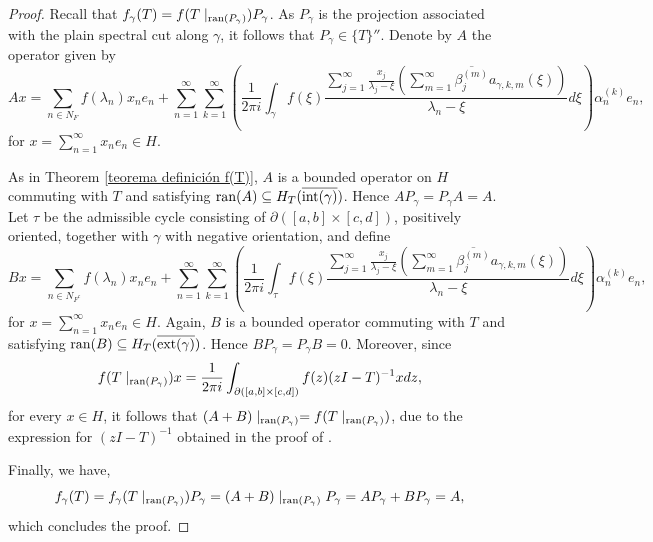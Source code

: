\documentclass[11pt]{amsart}
\theoremstyle{definition}
\theoremstyle{remark}
\numberwithin{equation}{section}
\newcommand{\ran}{\textnormal{ran}}
\newcommand{\al}{\alpha}
\newcommand{\Hint}{H_T(\overline{\inte(\gamma)})}
\newcommand{\Hext}{H_T(\overline{\exte(\gamma)})}
\newcommand{\sumn}{\sum_{n=1}^{\infty}}
\newcommand{\summ}{\sum_{m=1}^{\infty}}
\newcommand{\sumj}{\sum_{j=1}^\infty}
\newcommand{\biconm}[1]{{\{#1\}''}}
\newcommand{\inte}{\textnormal{int}}
\newcommand{\exte}{\textnormal{ext}}
\begin{document}
\begin{proof}
    Recall that $f_\gamma(T) =  f(T\mid_{\ran(P_\gamma)})P_\gamma$. As $P_\gamma$ is the projection associated with the plain spectral cut along $\gamma$, it follows that $P_\gamma \in \biconm{T}.$ Denote by $A$ the operator given by
    $$
    A x= \sum_{n\in N_F} f(\lambda_n)x_ne_n + \sumn \sum_{k=1}^\infty \left( \frac{1}{2\pi i} \int_{\gamma} f(\xi) \frac{ \sumj \frac{x_j}{\lambda_j-\xi}\left(\summ \overline{\beta_j^{(m)}}a_{\gamma,k,m}(\xi)\right)}{\lambda_n-\xi}        d\xi    \right)\al_n^{(k)}e_n,
    $$
    for $x=\sumn x_ne_n \in H$.

    As in Theorem \ref{teorema definición f(T)}, $A$ is a bounded operator on $H$ commuting with $T$ and satisfying $\ran(A)\subseteq \Hint$. Hence $AP_\gamma=P_\gamma A=A$. Let $\tau$ be the admissible cycle consisting of $\partial([a,b]\times[c,d])$, positively oriented, together with $\gamma$ with negative orientation, and define
    $$
    B x= \sum_{n\in N_{F^c}} f(\lambda_n)x_ne_n + \sumn \sum_{k=1}^\infty \left( \frac{1}{2\pi i} \int_{\tau} f(\xi) \frac{ \sumj \frac{x_j}{\lambda_j-\xi}\left(\summ \overline{\beta_j^{(m)}}a_{\gamma,k,m}(\xi)\right)}{\lambda_n-\xi}        d\xi    \right)\al_n^{(k)}e_n,
    $$
for $x=\sumn x_ne_n \in H$. Again, $B$ is a bounded operator commuting with $T$ and satisfying $\ran(B)\subseteq \Hext$. Hence $BP_\gamma=P_\gamma B=0$. Moreover, since
    $$
    f(T\mid_{\ran(P_\gamma)})x = \frac{1}{2\pi i} \int_{\partial ([a,b]\times [c,d])}f(z) (z I-T)^{-1}x dz,
    $$
    for every $x\in H$, it follows that $(A+B)\mid_{\ran(P_\gamma)}=f(T\mid_{\ran(P_\gamma)})$, due to the expression for $(zI-T)^{-1}$ obtained in the proof of \cite[Lemma 4.3]{GG3}.

    Finally, we have,
    $$
    f_\gamma(T) = f_\gamma(T\mid_{\ran(P_\gamma)}) P_\gamma = (A+B)\mid_{\ran(P_\gamma)} P_\gamma = AP_\gamma + BP_\gamma  = A,
    $$
    which concludes the proof.
\end{proof}
\end{document}
